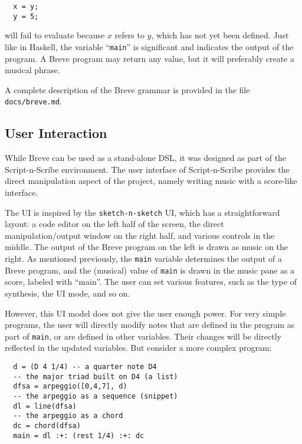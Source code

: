 \documentclass[nocopyrightspace,numbers,10pt]{sigplanconf}
\newcommand{\sketch}{\texttt{sketch-n-sketch}}
\newcommand{\sns}{Script-n-Scribe}
\begin{document}
\begin{center}
  \begin{verbatim}
  x = y;
  y = 5;
  \end{verbatim}
\end{center}

will fail to evaluate because $x$ refers to $y$, which has not yet been defined.
Just like in Haskell, the variable ``\texttt{main}'' is significant and
indicates the output of the program. A Breve program may return any value, but
it will preferably create a musical phrase.

A complete description of the Breve grammar is provided in the file
\texttt{docs/breve.md}.

\subsection{User Interaction}
\label{sub:sns:ui}

While Breve can be used as a stand-alone DSL, it was designed as part of the
\sns{} environment. The user interface of \sns{} provides the direct
manipulation aspect of the project, namely writing music with a score-like
interface.

The UI is inspired by the \sketch{} UI, which has a straightforward layout: a
code editor on the left half of the screen, the direct manipulation/output
window on the right half, and various controls in the middle. The output of the
Breve program on the left is drawn as music on the right. As mentioned
previously, the \texttt{main} variable determines the output of a Breve program,
and the (musical) value of \texttt{main} is drawn in the music pane as a score,
labeled with ``main''. The user can set various features, such as the type of
synthesis, the UI mode, and so on.

However, this UI model does not give the user enough power. For very simple
programs, the user will directly modify notes that are defined in the program as
part of \texttt{main}, or are defined in other variables. Their changes will be
directly reflected in the updated variables. But consider a more complex
program:

\begin{center}
  \begin{verbatim}
  d = (D 4 1/4) -- a quarter note D4
  -- the major triad built on D4 (a list)
  dfsa = arpeggio([0,4,7], d)
  -- the arpeggio as a sequence (snippet)
  dl = line(dfsa)
  -- the arpeggio as a chord
  dc = chord(dfsa)
  main = dl :+: (rest 1/4) :+: dc
  \end{verbatim}
\end{center}
\end{document}
